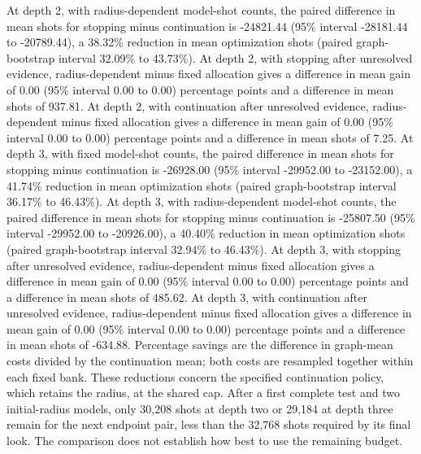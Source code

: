 {At depth 2, with radius-dependent model-shot counts, the paired difference in mean shots for stopping minus continuation is -24821.44 (95\% interval -28181.44 to -20789.44), a 38.32\% reduction in mean optimization shots (paired graph-bootstrap interval 32.09\% to 43.73\%).
At depth 2, with stopping after unresolved evidence, radius-dependent minus fixed allocation gives a difference in mean gain of 0.00 (95\% interval 0.00 to 0.00) percentage points and a difference in mean shots of 937.81.
At depth 2, with continuation after unresolved evidence, radius-dependent minus fixed allocation gives a difference in mean gain of 0.00 (95\% interval 0.00 to 0.00) percentage points and a difference in mean shots of 7.25.
At depth 3, with fixed model-shot counts, the paired difference in mean shots for stopping minus continuation is -26928.00 (95\% interval -29952.00 to -23152.00), a 41.74\% reduction in mean optimization shots (paired graph-bootstrap interval 36.17\% to 46.43\%).
At depth 3, with radius-dependent model-shot counts, the paired difference in mean shots for stopping minus continuation is -25807.50 (95\% interval -29952.00 to -20926.00), a 40.40\% reduction in mean optimization shots (paired graph-bootstrap interval 32.94\% to 46.43\%).
At depth 3, with stopping after unresolved evidence, radius-dependent minus fixed allocation gives a difference in mean gain of 0.00 (95\% interval 0.00 to 0.00) percentage points and a difference in mean shots of 485.62.
At depth 3, with continuation after unresolved evidence, radius-dependent minus fixed allocation gives a difference in mean gain of 0.00 (95\% interval 0.00 to 0.00) percentage points and a difference in mean shots of -634.88.
Percentage savings are the difference in graph-mean costs divided by the continuation mean; both costs are resampled together within each fixed bank. These reductions concern the specified continuation policy, which retains the radius, at the shared cap. After a first complete test and two initial-radius models, only 30,208 shots at depth two or 29,184 at depth three remain for the next endpoint pair, less than the 32,768 shots required by its final look. The comparison does not establish how best to use the remaining budget.
}
